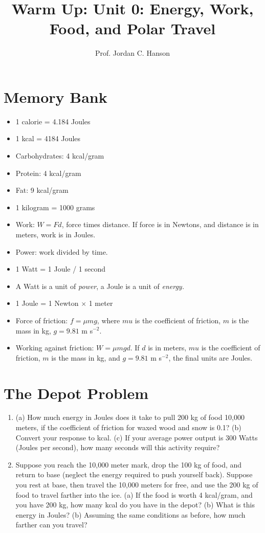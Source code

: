 \documentclass{article}
\begin{document}
\twocolumn

\title{Warm Up: Unit 0: Energy, Work, Food, and Polar Travel}
\author{Prof. Jordan C. Hanson}

\maketitle

\section{Memory Bank}
\begin{itemize}
\item 1 calorie = 4.184 Joules
\item 1 kcal = 4184 Joules
\item Carbohydrates: 4 kcal/gram
\item Protein: 4 kcal/gram
\item Fat: 9 kcal/gram
\item 1 kilogram = 1000 grams
\item Work: $W = F d$, force times distance.  If force is in Newtons, and distance is in meters, work is in Joules.
\item Power: work divided by time.
\item 1 Watt = 1 Joule / 1 second
\item A Watt is a unit of \textit{power}, a Joule is a unit of \textit{energy.}
\item 1 Joule = 1 Newton $\times$ 1 meter
\item Force of friction: $f = \mu m g$, where $mu$ is the coefficient of friction, $m$ is the mass in kg, $g = 9.81$ m s$^{-2}$.
\item Working against friction: $W = \mu m g d$.  If $d$ is in meters, $mu$ is the coefficient of friction, $m$ is the mass in kg, and $g = 9.81$ m s$^{-2}$, the final units are Joules.
\end{itemize}

\section{The Depot Problem}

\begin{enumerate}
\item (a) How much energy in Joules does it take to pull 200 kg of food 10,000 meters, if the coefficient of friction for waxed wood and snow is 0.1? (b) Convert your response to kcal. (c)  If your average power output is 300 Watts (Joules per second), how many seconds will this activity require? \\ \vspace{6cm}
\item Suppose you reach the 10,000 meter mark, drop the 100 kg of food, and return to base (neglect the energy required to push yourself back).  Suppose you rest at base, then travel the 10,000 meters for free, and use the 200 kg of food to travel farther into the ice.  (a) If the food is worth 4 kcal/gram, and you have 200 kg, how many kcal do you have in the depot? (b) What is this energy in Joules? (b) Assuming the same conditions as before, how much farther can you travel?
\end{enumerate}
\end{document}
